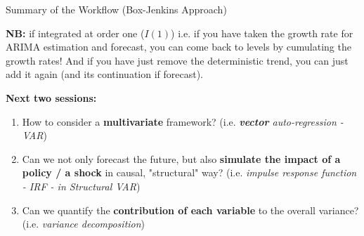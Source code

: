 \documentclass{beamer}
\begin{document}
\begin{frame}{Summary of the Workflow (Box-Jenkins Approach)}

\textbf{NB:} if integrated at order one ($I(1)$) i.e. if you have taken the growth rate for ARIMA estimation and forecast, you can come back to levels by cumulating the growth rates!
\medskip
And if you have just remove the deterministic trend, you can just add it again (and its continuation if forecast).

\medskip

\textbf{Next two sessions: }
\begin{enumerate}
    \item How to consider a \textbf{multivariate} framework? (i.e. \textit{\textbf{vector} auto-regression - VAR})
    \item Can we not only forecast the future, but also \textbf{simulate the impact of a policy / a shock} in causal, "structural" way? (i.e. \textit{impulse response function - IRF - in Structural VAR})
    \item Can we quantify the \textbf{contribution of each variable} to the overall variance? (i.e. \textit{variance decomposition})
\end{enumerate}
\end{frame}
\end{document}
